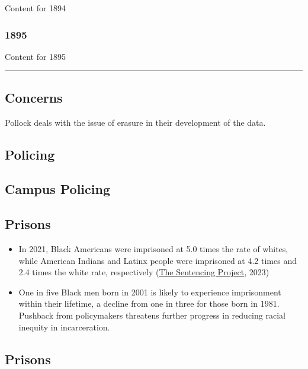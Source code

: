 \documentclass[
  letterpaper,
  DIV=11,
  numbers=noendperiod]{scrartcl}
\begin{document}
Content for 1894

\subsubsection{1895}

Content for 1895

\begin{center}\rule{0.5\linewidth}{0.5pt}\end{center}

\hypertarget{concerns}{%
\subsection{Concerns}\label{concerns}}

Pollock deals with the issue of erasure in their development of the
data.

\hypertarget{policing}{%
\subsection{Policing}\label{policing}}

\hypertarget{campus-policing}{%
\subsection{Campus Policing}\label{campus-policing}}

\hypertarget{prisons}{%
\subsection{Prisons}\label{prisons}}

\begin{itemize}
\item
  In 2021, Black Americans were imprisoned at 5.0 times the rate of
  whites, while American Indians and Latinx people were imprisoned at
  4.2 times and 2.4 times the white rate, respectively
  (\href{https://www.sentencingproject.org/reports/one-in-five-ending-racial-inequity-in-incarceration/}{The
  Sentencing Project}, 2023)
\item
  One in five Black men born in 2001 is likely to experience
  imprisonment within their lifetime, a decline from one in three for
  those born in 1981. Pushback from policymakers threatens further
  progress in reducing racial inequity in incarceration.
\end{itemize}

\hypertarget{prisons-1}{%
\subsection{Prisons}\label{prisons-1}}
\end{document}
